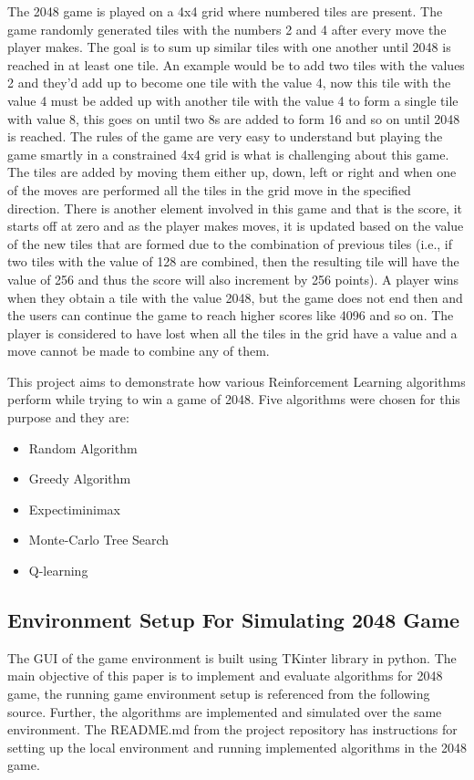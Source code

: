 \documentclass{svproc}
\begin{document}
    The 2048 game is played on a 4x4 grid where numbered tiles are present. The game randomly generated tiles with the numbers 2 and 4 after every move the player makes. The goal is to sum up similar tiles with one another until 2048 is reached in at least one tile. An example would be to add two tiles with the values 2 and they’d add up to become one tile with the value 4, now this tile with the value 4 must be added up with another tile with the value 4 to form a single tile with value 8, this goes on until two 8s are added to form 16 and so on until 2048 is reached. The rules of the game are very easy to understand but playing the game smartly in a constrained 4x4 grid is what is challenging about this game. The tiles are added by moving them either up, down, left or right and when one of the moves are performed all the tiles in the grid move in the specified direction. There is another element involved in this game and that is the score, it starts off at zero and as the player makes moves, it is updated based on the value of the new tiles that are formed due to the combination of previous tiles (i.e., if two tiles with the value of 128 are combined, then the resulting tile will have the value of 256 and thus the score will also increment by 256 points). A player wins when they obtain a tile with the value 2048, but the game does not end then and the users can continue the game to reach higher scores like 4096 and so on. The player is considered to have lost when all the tiles in the grid have a value and a move cannot be made to combine any of them.

    This project aims to demonstrate how various Reinforcement Learning algorithms perform while trying to win a game of 2048. Five algorithms were chosen for this purpose and they are:

    \begin{itemize}

        \item Random Algorithm
        \item Greedy Algorithm
        \item Expectiminimax
        \item Monte-Carlo Tree Search
        \item Q-learning

    \end{itemize}


    \subsection{Environment Setup For Simulating 2048 Game}
    The GUI of the game environment is built using TKinter library in python. The main objective of this paper is to implement and evaluate algorithms for 2048 game, the running game environment setup is referenced from the following source\cite{yangshun}.
    Further, the algorithms are implemented and simulated over the same environment. The README.md from the project repository \cite{AI-RKRS} has instructions for setting up the local environment and running implemented algorithms in the 2048 game.
\end{document}
